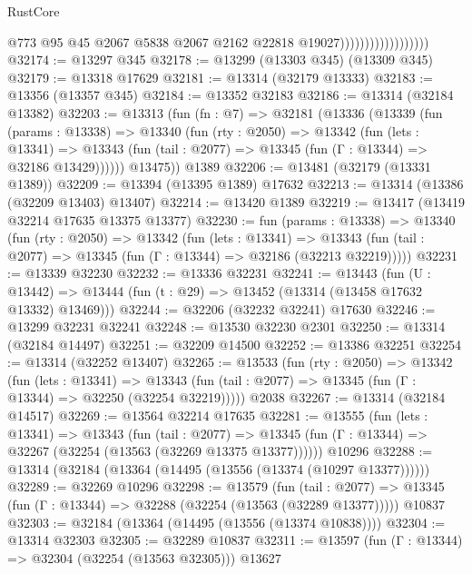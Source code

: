 \begin{lexlean}{RustCore}
\begin{coremodule}
                                        @773
                                        @95
                                        @45
                                        @2067
                                        @5838
                                        @2067
                                        @2162
                                        @22818
                                        @19027))))))))))))))))))
@32174 := @13297 @345
@32178 := @13299 (@13303 @345) (@13309 @345)
@32179 := @13318 @17629
@32181 := @13314 (@32179 @13333)
@32183 := @13356 (@13357 @345)
@32184 := @13352 @32183
@32186 := @13314 (@32184 @13382)
@32203 := @13313
    (fun (fn : @7) =>
    @32181
      (@13336
        (@13339
          (fun (params : @13338) =>
          @13340
            (fun (rty : @2050) =>
            @13342
              (fun (lets : @13341) =>
              @13343 (fun (tail : @2077) => @13345 (fun (Γ : @13344) => @32186 @13429))))))
        @13475))
    @1389
@32206 := @13481 (@32179 (@13331 @1389))
@32209 := @13394 (@13395 @1389) @17632
@32213 := @13314 (@13386 (@32209 @13403) @13407)
@32214 := @13420 @1389
@32219 := @13417 (@13419 @32214 @17635 @13375 @13377)
@32230 := fun (params : @13338) =>
  @13340
    (fun (rty : @2050) =>
    @13342
      (fun (lets : @13341) =>
      @13343 (fun (tail : @2077) => @13345 (fun (Γ : @13344) => @32186 (@32213 @32219)))))
@32231 := @13339 @32230
@32232 := @13336 @32231
@32241 := @13443
    (fun (U : @13442) => @13444 (fun (t : @29) => @13452 (@13314 (@13458 @17632 @13332) @13469)))
@32244 := @32206 (@32232 @32241) @17630
@32246 := @13299 @32231 @32241
@32248 := @13530 @32230 @2301
@32250 := @13314 (@32184 @14497)
@32251 := @32209 @14500
@32252 := @13386 @32251
@32254 := @13314 (@32252 @13407)
@32265 := @13533
    (fun (rty : @2050) =>
    @13342
      (fun (lets : @13341) =>
      @13343 (fun (tail : @2077) => @13345 (fun (Γ : @13344) => @32250 (@32254 @32219)))))
    @2038
@32267 := @13314 (@32184 @14517)
@32269 := @13564 @32214 @17635
@32281 := @13555
    (fun (lets : @13341) =>
    @13343
      (fun (tail : @2077) =>
      @13345 (fun (Γ : @13344) => @32267 (@32254 (@13563 (@32269 @13375 @13377))))))
    @10296
@32288 := @13314 (@32184 (@13364 (@14495 (@13556 (@13374 (@10297 @13377))))))
@32289 := @32269 @10296
@32298 := @13579
    (fun (tail : @2077) => @13345 (fun (Γ : @13344) => @32288 (@32254 (@13563 (@32289 @13377)))))
    @10837
@32303 := @32184 (@13364 (@14495 (@13556 (@13374 @10838))))
@32304 := @13314 @32303
@32305 := @32289 @10837
@32311 := @13597 (fun (Γ : @13344) => @32304 (@32254 (@13563 @32305))) @13627

\end{coremodule}
\end{lexlean}

